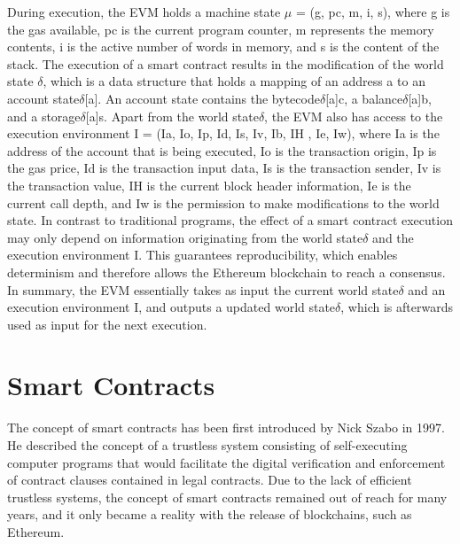         During execution, the EVM holds a machine state $\mu$ = (g, pc, m, i, s), where g is the gas available, pc is the current program counter, m represents the memory contents, i is the active number of words in memory, and s is the content of the stack.
        The execution of a smart contract results in the modification of the world state $\delta$, which is a data structure that holds a mapping of an address a to an account state$\delta$[a].
        An account state contains the bytecode$\delta$[a]c, a balance$\delta$[a]b, and a storage$\delta$[a]s.
        Apart from the world state$\delta$, the EVM also has access to the execution environment I = (Ia, Io, Ip, Id, Is, Iv, Ib, IH , Ie, Iw), where Ia is the address of the account that is being executed, Io is the transaction origin, Ip is the gas price, Id is the transaction input data, Is is the transaction sender, Iv is the transaction value, IH is the current block header information, Ie is the current call depth, and Iw is the permission to make modifications to the world state.
        In contrast to traditional programs, the effect of a smart contract execution may only depend on information originating from the world state$\delta$ and the execution environment I.
        This guarantees reproducibility, which enables determinism and therefore allows the Ethereum blockchain to reach a consensus.
        In summary, the EVM essentially takes as input the current world state$\delta$ and an execution environment I, and outputs a updated world state$\delta$, which is afterwards used as input for the next execution.


\section{Smart Contracts}
    The concept of smart contracts has been first introduced by Nick Szabo in 1997. He described the concept of a trustless system consisting of self-executing computer programs that would facilitate the digital verification and enforcement of contract clauses contained in legal contracts. Due to the lack of efficient trustless systems, the concept of smart contracts remained out of reach for many years, and it only became a reality with the release of blockchains, such as Ethereum.

